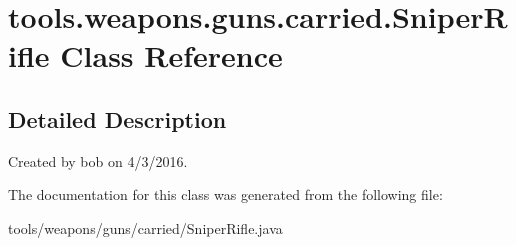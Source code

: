 \hypertarget{classtools_1_1weapons_1_1guns_1_1carried_1_1_sniper_rifle}{}\section{tools.\+weapons.\+guns.\+carried.\+Sniper\+Rifle Class Reference}
\label{classtools_1_1weapons_1_1guns_1_1carried_1_1_sniper_rifle}


\subsection{Detailed Description}
Created by bob on 4/3/2016. 

The documentation for this class was generated from the following file\+:\begin{DoxyCompactItemize}
\item 
tools/weapons/guns/carried/Sniper\+Rifle.\+java\end{DoxyCompactItemize}
